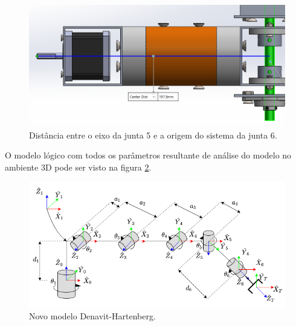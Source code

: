 \begin{figure}[ht]
    \caption{Distância entre o eixo da junta 5 e a origem do sistema da junta 6.}    
    \begin{centering}

        \includegraphics[width=0.9\columnwidth]{adendo/images/d6.png}
    
    \par\end{centering}

    \label{fig:d6}
\end{figure}

O modelo lógico com todos os parâmetros resultante de análise do modelo no ambiente 3D
pode ser visto na figura \ref{fig:DH-Apendice}.

\begin{figure}[ht]
    \caption{Novo modelo Denavit-Hartenberg.}    
    \begin{centering}

        \includegraphics[width=0.9\columnwidth]{images/arm/Refframes2.png}
    
    \par\end{centering}

    \label{fig:DH-Apendice}
\end{figure}